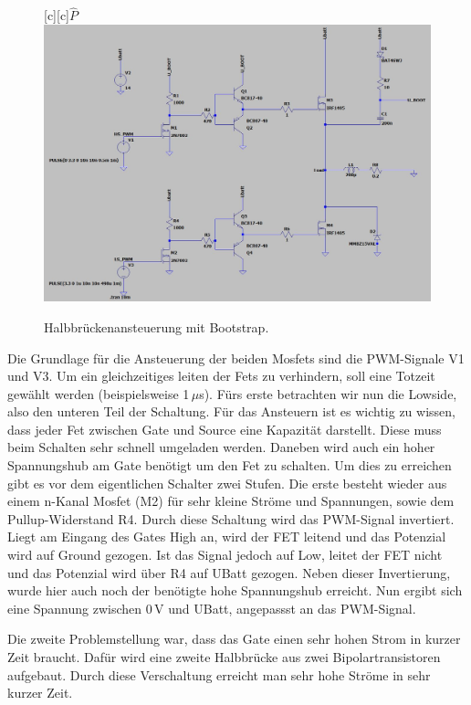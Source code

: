 \begin{figure}[H]
	\renewcommand{\figurename}{Abbildung}
	\centering	
	\psfragscanon		
	[c]{$\hat{P}$}
	\includegraphics[width=1\textwidth,angle=0]{Bilder/6.jpg}		
	\caption{Halbbrückenansteuerung mit Bootstrap.}
	\label{ME}
\end{figure}

Die Grundlage für die Ansteuerung der beiden Mosfets sind die PWM-Signale V1 und V3. Um ein gleichzeitiges leiten der Fets zu verhindern, soll eine Totzeit gewählt werden (beispielsweise 1\,$\mu$s). Fürs erste betrachten wir nun die Lowside, also den unteren Teil der Schaltung. Für das Ansteuern ist es wichtig zu wissen, dass jeder Fet zwischen Gate und Source eine Kapazität darstellt. Diese muss beim Schalten sehr schnell umgeladen werden. Daneben wird auch ein hoher Spannungshub am Gate benötigt um den Fet zu schalten. Um dies zu erreichen gibt es vor dem eigentlichen Schalter zwei Stufen. Die erste besteht wieder aus einem n-Kanal Mosfet (M2) für sehr kleine Ströme und Spannungen, sowie dem Pullup-Widerstand R4. Durch diese Schaltung wird das PWM-Signal invertiert. Liegt am Eingang des Gates High an, wird der FET leitend und das Potenzial wird auf Ground gezogen. Ist das Signal jedoch auf Low, leitet der FET nicht und das Potenzial wird über R4 auf UBatt gezogen. Neben dieser Invertierung, wurde hier auch noch der benötigte hohe Spannungshub erreicht. Nun ergibt sich eine Spannung zwischen 0\,V und UBatt, angepassst an das PWM-Signal. 

Die zweite Problemstellung war, dass das Gate einen sehr hohen Strom in kurzer Zeit braucht. Dafür wird eine zweite Halbbrücke aus zwei Bipolartransistoren aufgebaut. Durch diese Verschaltung erreicht man sehr hohe Ströme in sehr kurzer Zeit.

